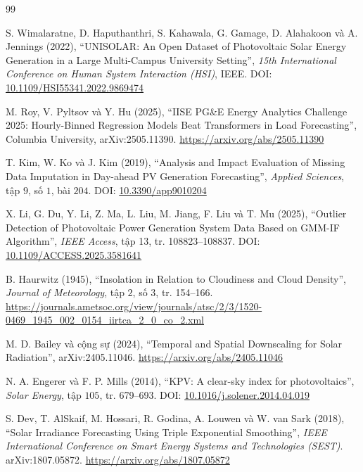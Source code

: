 \documentclass[12pt,a4paper]{article}
\begin{document}
\clearpage
\begin{thebibliography}{99}

S. Wimalaratne, D. Haputhanthri, S. Kahawala, G. Gamage, D. Alahakoon và A. Jennings (2022),
``UNISOLAR: An Open Dataset of Photovoltaic Solar Energy Generation in a Large Multi-Campus
University Setting'',
\textit{15th International Conference on Human System Interaction (HSI)}, IEEE.
DOI: \href{https://doi.org/10.1109/HSI55341.2022.9869474}{10.1109/HSI55341.2022.9869474}

M. Roy, V. Pyltsov và Y. Hu (2025),
``IISE PG\&E Energy Analytics Challenge 2025: Hourly-Binned Regression Models Beat
Transformers in Load Forecasting'',
Columbia University, arXiv:2505.11390.
\url{https://arxiv.org/abs/2505.11390}

T. Kim, W. Ko và J. Kim (2019),
``Analysis and Impact Evaluation of Missing Data Imputation in Day-ahead PV Generation
Forecasting'',
\textit{Applied Sciences}, tập $9$, số $1$, bài $204$.
DOI: \href{https://doi.org/10.3390/app9010204}{10.3390/app9010204}

X. Li, G. Du, Y. Li, Z. Ma, L. Liu, M. Jiang, F. Liu và T. Mu (2025),
``Outlier Detection of Photovoltaic Power Generation System Data Based on GMM-IF
Algorithm'',
\textit{IEEE Access}, tập 13, tr. 108823--108837.
DOI: \href{https://doi.org/10.1109/ACCESS.2025.3581641}{10.1109/ACCESS.2025.3581641}

B. Haurwitz (1945),
``Insolation in Relation to Cloudiness and Cloud Density'',
\textit{Journal of Meteorology}, tập $2$, số $3$, tr. 154--166.
\url{https://journals.ametsoc.org/view/journals/atsc/2/3/1520-0469_1945_002_0154_iirtca_2_0_co_2.xml}

M. D. Bailey và cộng sự (2024),
``Temporal and Spatial Downscaling for Solar Radiation'',
arXiv:2405.11046. \url{https://arxiv.org/abs/2405.11046}

N. A. Engerer và F. P. Mills (2014),
``KPV: A clear-sky index for photovoltaics'',
\textit{Solar Energy}, tập $105$, tr. 679--693.
DOI: \href{https://doi.org/10.1016/j.solener.2014.04.019}{10.1016/j.solener.2014.04.019}

S. Dev, T. AlSkaif, M. Hossari, R. Godina, A. Louwen và W. van Sark (2018),
``Solar Irradiance Forecasting Using Triple Exponential Smoothing'',
\textit{IEEE International Conference on Smart Energy Systems and Technologies (SEST)}.
arXiv:1807.05872. \url{https://arxiv.org/abs/1807.05872}


\end{thebibliography}
\end{document}
